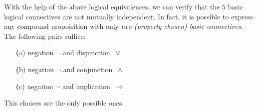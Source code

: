 \documentclass[11pt,paper=b5,footinclude,headinclude]{scrbook} %
\def\ali {{~\vee~}}
\def\inn {{~\wedge~}}
\def\sledi {{~\Rightarrow~}}
\def\cee {{~\Leftrightarrow~}}
\theoremstyle{remark}
\theoremstyle{definition} %
\begin{document}
%
%
%
%
%
%
%
With the help of the above logical equivalences, we can verify that the $5$ basic logical connectives are
not mutually independent.
In fact, it is possible to express any compound propoisition with only
{\em two (properly chosen) basic connectives}.
The following pairs suffice:
\begin{enumerate}
  \item[{\textbf (a)}] negation $\neg$ and disjunction $\ali$
  \item[{\textbf (b)}] negation $\neg$ and conjunction $\inn$
  \item[{\textbf (c)}] negation  $\neg$ and implication $\sledi$
\end{enumerate}
This choices are the only possible ones.
\end{document}
